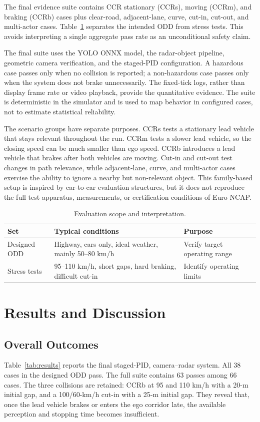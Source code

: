 \documentclass[conference]{IEEEtran}
\begin{document}
The final evidence suite contains CCR stationary (CCRs), moving (CCRm), and
braking (CCRb) cases plus clear-road, adjacent-lane, curve, cut-in, cut-out,
and multi-actor cases. Table~\ref{tab:scope} separates the intended ODD from
stress tests. This avoids interpreting a single aggregate pass rate as an
unconditional safety claim.

The final suite uses the YOLO ONNX model, the radar-object pipeline, geometric
camera verification, and the staged-PID configuration. A hazardous case passes
only when no collision is reported; a non-hazardous case passes only when the
system does not brake unnecessarily. The fixed-tick logs, rather than display
frame rate or video playback, provide the quantitative evidence. The suite is
deterministic in the simulator and is used to map behavior in configured cases,
not to estimate statistical reliability.

The scenario groups have separate purposes. CCRs tests a stationary lead vehicle
that stays relevant throughout the run. CCRm tests a slower lead vehicle, so the
closing speed can be much smaller than ego speed. CCRb introduces a lead vehicle
that brakes after both vehicles are moving. Cut-in and cut-out test changes in
path relevance, while adjacent-lane, curve, and multi-actor cases exercise the
ability to ignore a nearby but non-relevant object. This family-based setup is
inspired by car-to-car evaluation structures, but it does not reproduce the full
test apparatus, measurements, or certification conditions of Euro NCAP.

\begin{table}[t]
\caption{Evaluation scope and interpretation.}
\label{tab:scope}
\centering
\footnotesize
\begin{tabular}{p{}p{}p{}}
\toprule
Set & Typical conditions & Purpose \\
\midrule
Designed ODD & Highway, cars only, ideal weather, mainly 50--80 km/h & Verify target operating range \\
Stress tests & 95--110 km/h, short gaps, hard braking, difficult cut-in & Identify operating limits \\
\bottomrule
\end{tabular}
\end{table}

\section{Results and Discussion}
\subsection{Overall Outcomes}
Table~\ref{tab:results} reports the final staged-PID, camera--radar system.
All 38 cases in the designed ODD pass. The full suite contains 63 passes among
66 cases. The three collisions are retained: CCRb at 95 and 110 km/h with a
20-m initial gap, and a 100/60-km/h cut-in with a 25-m initial gap. They reveal
that, once the lead vehicle brakes or enters the ego corridor late, the available
perception and stopping time becomes insufficient.
\end{document}
